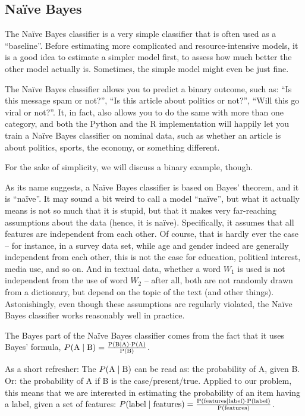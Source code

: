 \subsection{Na\"ive Bayes} \label{subsec:Na\"ive Bayes}

The Na\"ive Bayes classifier is a very simple classifier that is often
used as a ``baseline''. Before estimating more complicated and
resource-intensive models, it is a good idea to estimate a simpler
model first, to assess how much better the other model actually
is. Sometimes, the simple model might even be just fine.

The Na\"ive Bayes classifier allows you to predict a binary outcome,
such as: ``Is this message spam or not?'', ``Is this article about
politics or not?'', ``Will this go viral or not?''.  It, in fact, also
allows you to do the same with more than one category, and both the
Python and the R implementation will happily let you train a Na\"ive
Bayes classifier on nominal data, such as whether an article is about
politics, sports, the economy, or something different.

For the sake of simplicity, we will discuss a binary example, though.

As its name suggests, a Na\"ive Bayes classifier is based on Bayes'
theorem, and it is ``na\"ive''.  It may sound a bit weird to call a
model ``na\"ive'', but what it actually means is not so much that it
is stupid, but that it makes very far-reaching assumptions about the
data (hence, it is na\"ive). Specifically, it assumes that all
features are independent from each other.  Of course, that is hardly
ever the case -- for instance, in a survey data set, while age and
gender indeed are generally independent from each other, this is not the case for education, political interest,
media use, and so on.  And in textual data, whether a word $W_1$ is used
is not independent from the use of word $W_2$ -- after all, both are not
randomly drawn from a dictionary, but depend on the topic of the text
(and other things).  Astonishingly, even though these assumptions are
regularly violated, the Na\"ive Bayes classifier works reasonably well
in practice.

The Bayes part of the Na\"ive Bayes classifier comes from the fact
that it uses Bayes' formula, $ P(\rm{A} \mid \rm{B}) = \frac{P(\rm{B} \mid \rm{A}) \cdot P(\rm{A})}{P(\rm {B})} $.

As a short refresher: The $P(\rm{A} \mid \rm{B})$ can be read as: the
probability of A, given B. Or: the probability of A if B is the
case/present/true.  Applied to our problem, this means that we are
interested in estimating the probability of an item having a label,
given a set of features:
$ P(\rm{label} \mid \rm{features}) = \frac{P(\rm{features} \mid \rm{label}) \cdot P(\rm{label})}{P(\rm{features})} $.

